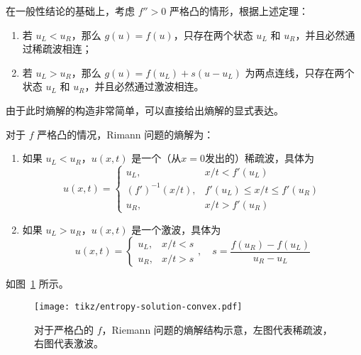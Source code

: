 在一般性结论的基础上，考虑 $f'' > 0$ 严格凸的情形，根据上述定理：
\begin{enumerate}
    \item 若 $u_L < u_R$，那么 $g(u) = f(u)$，只存在两个状态 $u_L$ 和 $u_R$，并且必然通过稀疏波相连；
    \item 若 $u_L > u_R$，那么 $g(u) = f(u_L) + s(u - u_L)$ 为两点连线，只存在两个状态 $u_L$ 和 $u_R$，并且必然通过激波相连。
\end{enumerate}
由于此时熵解的构造非常简单，可以直接给出熵解的显式表达。

\begin{theorem}
    对于 $f$ 严格凸的情况，Rimann 问题的熵解为：
    \begin{enumerate}
        \item 如果 $u_L < u_R$，$u(x,t)$ 是一个（从$x=0$发出的）稀疏波，具体为
              \[
                  u(x,t) ={}
                  \begin{cases}
                      u_L,            & x/t < f'(u_L)               \\
                      (f')^{-1}(x/t), & f'(u_L) \le x/t \le f'(u_R) \\
                      u_R,            & x/t > f'(u_R)
                  \end{cases}
              \]
        \item 如果 $u_L > u_R$，$u(x,t)$ 是一个激波，具体为
              \[
                  u(x,t) =
                  \begin{cases}
                      u_L, & x/t < s \\
                      u_R, & x/t > s
                  \end{cases},\quad s = \frac{f(u_R)-f(u_L)}{u_R - u_L}
              \]
    \end{enumerate}
    如图~\ref{fig:entropy-solution-convex} 所示。
\end{theorem}

\begin{figure}[htbp]
    \centering
    \texttt{[image: tikz/entropy-solution-convex.pdf]}
    \caption{对于严格凸的 $f$，Riemann 问题的熵解结构示意，左图代表稀疏波，右图代表激波。} \label{fig:entropy-solution-convex}
\end{figure}

